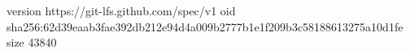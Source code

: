 version https://git-lfs.github.com/spec/v1
oid sha256:62d39eaab3fae392db212e94d4a009b2777b1e1f209b3c58188613275a10d1fe
size 43840
